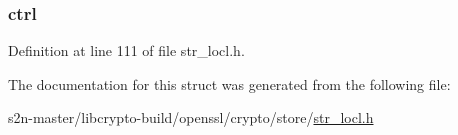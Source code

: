 \subsubsection[{\texorpdfstring{ctrl}{ctrl}}]{ ctrl}\hypertarget{structstore__method__st_a3ea532ae62a9efaaec780a90b14c4192}{}\label{structstore__method__st_a3ea532ae62a9efaaec780a90b14c4192}


Definition at line 111 of file str\+\_\+locl.\+h.



The documentation for this struct was generated from the following file\+:\begin{DoxyCompactItemize}
\item 
s2n-\/master/libcrypto-\/build/openssl/crypto/store/\hyperlink{str__locl_8h}{str\+\_\+locl.\+h}\end{DoxyCompactItemize}
